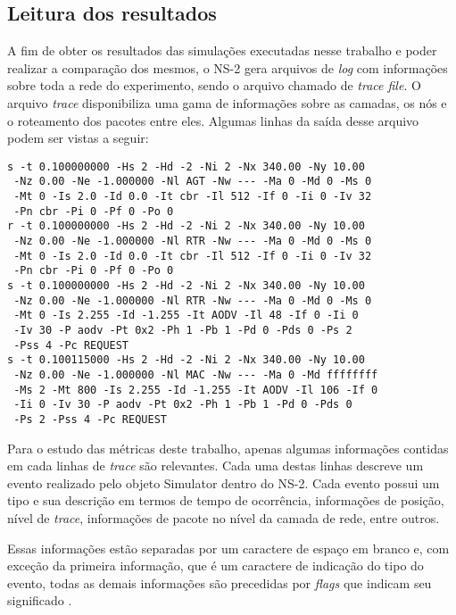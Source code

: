 \subsection{Leitura dos resultados}
A fim de obter os resultados das simula\c{c}\~oes executadas nesse trabalho e poder realizar a compara\c{c}\~ao dos mesmos, o NS-2 gera arquivos de \textit{log} com informa\c{c}\~oes sobre toda a rede do experimento, sendo o arquivo chamado de \textit{trace file}.
O arquivo \textit{trace} disponibiliza uma gama de informa\c{c}\~oes sobre as camadas, os n\'os e o roteamento dos pacotes entre eles.
Algumas linhas da sa\'ida desse arquivo podem ser vistas a seguir:

\begin{verbatim}
s -t 0.100000000 -Hs 2 -Hd -2 -Ni 2 -Nx 340.00 -Ny 10.00 
 -Nz 0.00 -Ne -1.000000 -Nl AGT -Nw --- -Ma 0 -Md 0 -Ms 0 
 -Mt 0 -Is 2.0 -Id 0.0 -It cbr -Il 512 -If 0 -Ii 0 -Iv 32 
 -Pn cbr -Pi 0 -Pf 0 -Po 0 
r -t 0.100000000 -Hs 2 -Hd -2 -Ni 2 -Nx 340.00 -Ny 10.00 
 -Nz 0.00 -Ne -1.000000 -Nl RTR -Nw --- -Ma 0 -Md 0 -Ms 0 
 -Mt 0 -Is 2.0 -Id 0.0 -It cbr -Il 512 -If 0 -Ii 0 -Iv 32 
 -Pn cbr -Pi 0 -Pf 0 -Po 0 
s -t 0.100000000 -Hs 2 -Hd -2 -Ni 2 -Nx 340.00 -Ny 10.00 
 -Nz 0.00 -Ne -1.000000 -Nl RTR -Nw --- -Ma 0 -Md 0 -Ms 0 
 -Mt 0 -Is 2.255 -Id -1.255 -It AODV -Il 48 -If 0 -Ii 0 
 -Iv 30 -P aodv -Pt 0x2 -Ph 1 -Pb 1 -Pd 0 -Pds 0 -Ps 2 
 -Pss 4 -Pc REQUEST 
s -t 0.100115000 -Hs 2 -Hd -2 -Ni 2 -Nx 340.00 -Ny 10.00 
 -Nz 0.00 -Ne -1.000000 -Nl MAC -Nw --- -Ma 0 -Md ffffffff 
 -Ms 2 -Mt 800 -Is 2.255 -Id -1.255 -It AODV -Il 106 -If 0 
 -Ii 0 -Iv 30 -P aodv -Pt 0x2 -Ph 1 -Pb 1 -Pd 0 -Pds 0 
 -Ps 2 -Pss 4 -Pc REQUEST 
\end{verbatim}

Para o estudo das m\'etricas deste trabalho, apenas algumas informa\c{c}\~oes contidas em cada linhas de \textit{trace} s\~ao relevantes.
Cada uma destas linhas descreve um evento realizado pelo objeto Simulator dentro do NS-2.
Cada evento possui um tipo e sua descri\c{c}\~ao em termos de tempo de ocorr\^encia, informa\c{c}\~oes de posi\c{c}\~ao, n\'ivel de \textit{trace}, informa\c{c}\~oes de pacote no n\'ivel da camada de rede, entre outros.

Essas informa\c{c}\~oes est\~ao separadas por um caractere de espa\c{c}o em branco e, com exce\c{c}\~ao da primeira informa\c{c}\~ao, que \'e um caractere de indica\c{c}\~ao do tipo do evento, todas as demais informa\c{c}\~oes s\~ao precedidas por \textit{flags} que indicam seu significado \cite{FallVaradhan}.


